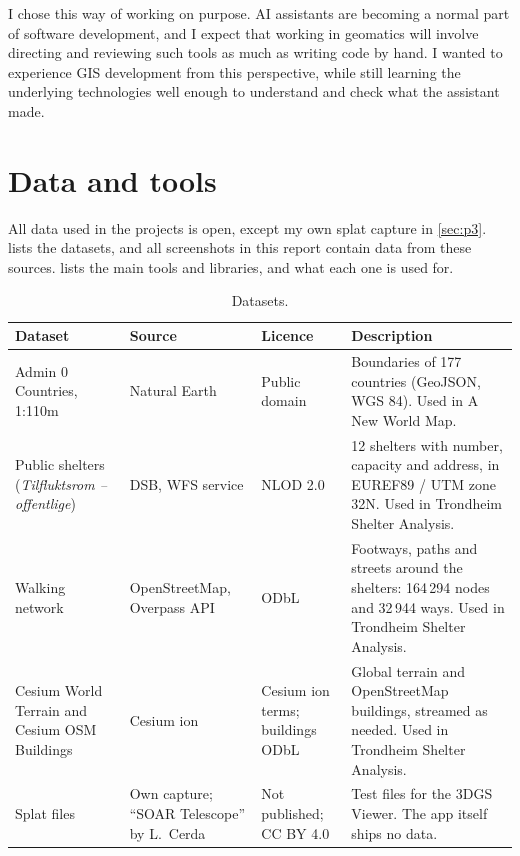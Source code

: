 I chose this way of working on purpose. AI assistants are becoming a normal part of software development, and I expect that working in geomatics will involve directing and reviewing such tools as much as writing code by hand. I wanted to experience GIS development from this perspective, while still learning the underlying technologies well enough to understand and check what the assistant made.

\section{Data and tools}\label{sec:data}

All data used in the projects is open, except my own splat capture in \cref{sec:p3}.  lists the datasets, and all screenshots in this report contain data from these sources.  lists the main tools and libraries, and what each one is used for.

\begin{table}[!ht]
\centering
\caption{Datasets.}
\label{tab:data}
\small
\begin{tabularx}{\textwidth}{L{3.6cm} L{2.6cm} L{1.9cm} Y}
\toprule
Dataset & Source & Licence & Description \\
\midrule
Admin 0 Countries, 1:110m & Natural Earth \citep{naturalearth} & Public domain & Boundaries of 177 countries (GeoJSON, WGS 84). Used in A New World Map. \\
\addlinespace
Public shelters (\emph{Tilfluktsrom -- offentlige}) & DSB, WFS service \citep{dsbwfs} & NLOD 2.0 & 12 shelters with number, capacity and address, in EUREF89 / UTM zone 32N. Used in Trondheim Shelter Analysis. \\
\addlinespace
Walking network & OpenStreetMap, Overpass API \citep{overpass} & ODbL & Footways, paths and streets around the shelters: 164\,294 nodes and 32\,944 ways. Used in Trondheim Shelter Analysis. \\
\addlinespace
Cesium World Terrain and Cesium OSM Buildings & Cesium ion & Cesium ion terms; buildings ODbL & Global terrain and OpenStreetMap buildings, streamed as needed. Used in Trondheim Shelter Analysis. \\
\addlinespace
Splat files & Own capture; ``SOAR Telescope'' by L.~Cerda \citep{soar} & Not published; CC BY 4.0 & Test files for the 3DGS Viewer. The app itself ships no data. \\
\bottomrule
\end{tabularx}
\end{table}

